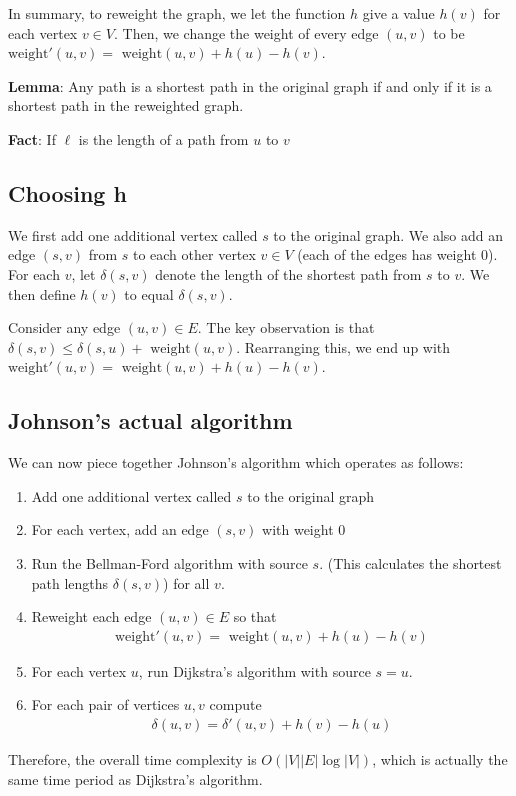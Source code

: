 \documentclass[11pt,a4paper,titlepage,dvipsnames,cmyk]{scrartcl}
\begin{document}
In summary, to reweight the graph, we let the function $h$ give a value
$h(v)$ for each vertex $v\in V$. Then, we change the weight of every edge
$(u,v)$ to be $\text{weight}'(u,v) = \text{ weight}(u,v) + h(u) - h(v)$.

\textbf{Lemma}: Any path is a shortest path in the original graph if and
only if it is a shortest path in the reweighted graph.

\textbf{Fact}: If $\ell$ is the length of a path from $u$ to $v$ %

\subsection{Choosing h}%
\label{sub:Choosing-h}
We first add one additional vertex called $s$ to the original graph. We
also add an edge $(s,v)$ from $s$ to each other vertex $v \in V$ (each of
the edges has weight 0). For each $v$, let $\delta(s,v)$ denote the length
of the shortest path from $s$ to $v$. We then define $h(v)$ to equal
$\delta(s,v)$.

Consider any edge $(u,v) \in E$. The key observation is that $\delta(s,v)
\le \delta(s,u) + \text{ weight}(u,v)$. Rearranging this, we end up with
$\text{weight}'(u,v) = \text{ weight} (u,v) + h(u) - h(v)$.

\subsection{Johnson's actual algorithm}%
\label{sub:real-johnson}
We can now piece together Johnson's algorithm which operates as follows:
\begin{enumerate}
    \item Add one additional vertex called $s$ to the original graph
    \item For each vertex, add an edge $(s,v)$ with weight 0
    \item Run the Bellman-Ford algorithm with source $s$. (This calculates
        the shortest path lengths $\delta(s,v)$) for all $v$.
    \item Reweight each edge $(u,v) \in E$ so that 
        \begin{align*}
            \text{weight}'(u,v) = \text{ weight}(u,v) + h(u) - h(v)
        \end{align*}
    \item For each vertex $u$, run Dijkstra's algorithm with source $s =
        u$.
    \item For each pair of vertices $u,v$ compute
        \begin{align*}
            \delta(u,v) = \delta'(u,v) + h(v) - h(u)
        \end{align*}
\end{enumerate}

Therefore, the overall time complexity is $O(|V||E|\log|V|)$, which is
actually the same time period as Dijkstra's algorithm.
\end{document}
